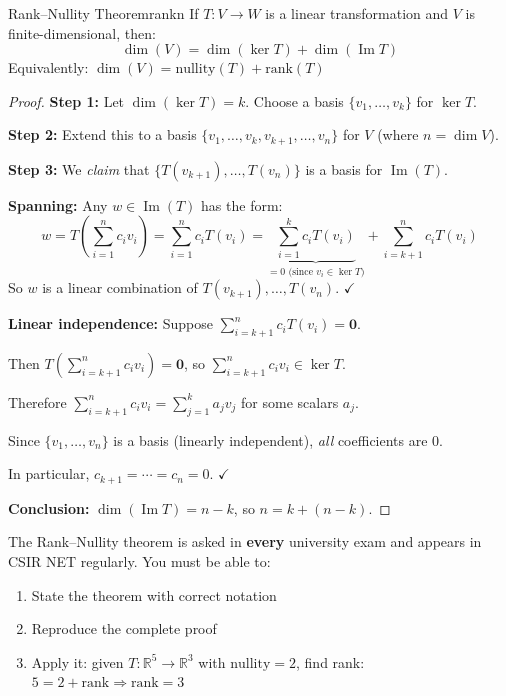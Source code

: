 \documentclass[12pt,a4paper]{book}
\begin{document}
\begin{theorem}{Rank--Nullity Theorem}{rankn}
If $T: V \to W$ is a linear transformation and $V$ is finite-dimensional, then:
\[
\boxed{\dim(V) = \dim(\ker T) + \dim(\operatorname{Im} T)}
\]
Equivalently: \quad $\dim(V) = \text{nullity}(T) + \text{rank}(T)$
\end{theorem}

\begin{proof}
\textbf{Step 1:} Let $\dim(\ker T) = k$. Choose a basis $\{v_1, \ldots, v_k\}$ for $\ker T$.

\textbf{Step 2:} Extend this to a basis $\{v_1, \ldots, v_k, v_{k+1}, \ldots, v_n\}$ for $V$ (where $n = \dim V$).

\textbf{Step 3:} We \textit{claim} that $\{T(v_{k+1}), \ldots, T(v_n)\}$ is a basis for $\operatorname{Im}(T)$.

\textbf{Spanning:} Any $w \in \operatorname{Im}(T)$ has the form:
\[
w = T\!\left(\sum_{i=1}^n c_i v_i\right) = \sum_{i=1}^n c_i T(v_i) = \underbrace{\sum_{i=1}^k c_i T(v_i)}_{= 0 \text{ (since $v_i \in \ker T$)}} + \sum_{i=k+1}^n c_i T(v_i)
\]
So $w$ is a linear combination of $T(v_{k+1}), \ldots, T(v_n)$. $\checkmark$

\textbf{Linear independence:} Suppose $\displaystyle\sum_{i=k+1}^n c_i T(v_i) = \mathbf{0}$.

Then $T\!\left(\displaystyle\sum_{i=k+1}^n c_i v_i\right) = \mathbf{0}$, so $\displaystyle\sum_{i=k+1}^n c_i v_i \in \ker T$.

Therefore $\displaystyle\sum_{i=k+1}^n c_i v_i = \sum_{j=1}^k a_j v_j$ for some scalars $a_j$.

Since $\{v_1, \ldots, v_n\}$ is a basis (linearly independent), \textit{all} coefficients are $0$.

In particular, $c_{k+1} = \cdots = c_n = 0$. $\checkmark$

\textbf{Conclusion:} $\dim(\operatorname{Im} T) = n - k$, so $n = k + (n-k)$.
\end{proof}

\begin{importantbox}
The Rank--Nullity theorem is asked in \textbf{every} university exam and appears in CSIR NET regularly. You must be able to:
\begin{enumerate}
    \item State the theorem with correct notation
    \item Reproduce the complete proof
    \item Apply it: given $T: \mathbb{R}^5 \to \mathbb{R}^3$ with $\text{nullity} = 2$, find rank: $5 = 2 + \text{rank} \Rightarrow \text{rank} = 3$
\end{enumerate}
\end{importantbox}
\end{document}
